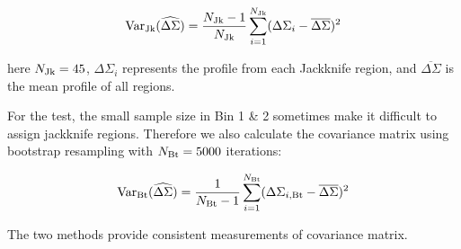 \documentclass[fleqn,usenatbib,useAMS]{mnras}
\begin{document}
    \begin{equation}
        \mathrm{Var}_{\rm Jk}(\widehat{\Delta\Sigma}) = \frac{N_{\rm Jk} - 1}{N_{\rm Jk}} \sum\limits_{i=1}^{N_{\rm Jk}} (\Delta\Sigma_{i} - \overline{\Delta\Sigma})^2
    \end{equation}

    \noindent here $N_{\rm Jk}=45$, $\Delta\Sigma_{i}$ represents the \dsigma{} profile from each
    Jackknife region, and $\overline{\Delta\Sigma}$ is the mean profile of all regions.

    For the \topn{} test, the small sample size in Bin 1 \& 2 sometimes make it difficult to assign
    jackknife regions. Therefore we also calculate the covariance matrix using bootstrap resampling
    with $N_{\rm Bt}=5000$ iterations:

    \begin{equation}
        \mathrm{Var}_{\rm Bt}(\widehat{\Delta\Sigma}) = \frac{1}{N_{\rm Bt} - 1} \sum\limits_{i=1}^{N_{\rm Bt}} (\Delta\Sigma_{i, \rm Bt} - \overline{\Delta\Sigma})^2
    \end{equation}

    \noindent The two methods provide consistent measurements of covariance matrix.
\end{document}
